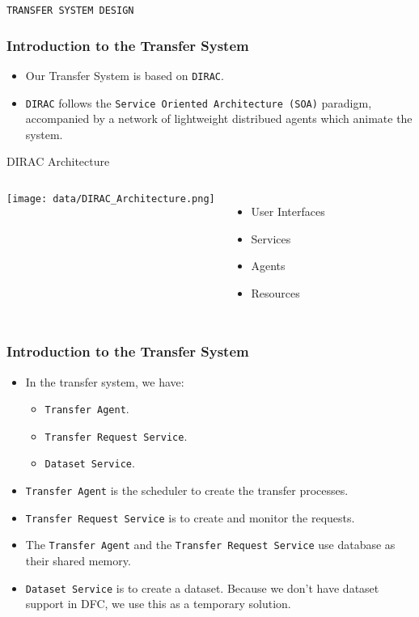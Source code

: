 \begin{frame}
    \begin{center}
        \LARGE \tt{TRANSFER SYSTEM DESIGN}
    \end{center}
\end{frame}

\begin{frame}
    \frametitle{Introduction to the Transfer System}
    \begin{itemize}
        \item Our Transfer System is based on {\tt DIRAC}. %
        \item {\tt DIRAC} follows the {\tt Service Oriented Architecture (SOA)}
                paradigm, accompanied by a network of lightweight distribued
                agents which animate the system.
    \end{itemize}
    \begin{block}{DIRAC Architecture}
        \begin{columns}
                \texttt{[image: data/DIRAC\_Architecture.png]}
                \begin{itemize}
                    \item User Interfaces
                    \item Services
                    \item Agents
                    \item Resources
                \end{itemize}
        \end{columns}
    \end{block}
\end{frame}

\begin{frame}
    \frametitle{Introduction to the Transfer System}
    \begin{itemize}
        \item In the transfer system, we have:
        \begin{itemize}
            \item {\tt Transfer Agent}.
            \item {\tt Transfer Request Service}.
            \item {\tt Dataset Service}.
        \end{itemize}
        \item {\tt Transfer Agent} is the scheduler to create the transfer 
              processes.
        \item {\tt Transfer Request Service} is to create and monitor the requests.
        \item The {\tt Transfer Agent} and the {\tt Transfer Request Service} 
              use database as their shared memory.
        \item {\tt Dataset Service} is to create a dataset. Because we don't have
              dataset support in DFC, we use this as a temporary solution.

    \end{itemize}
\end{frame}

